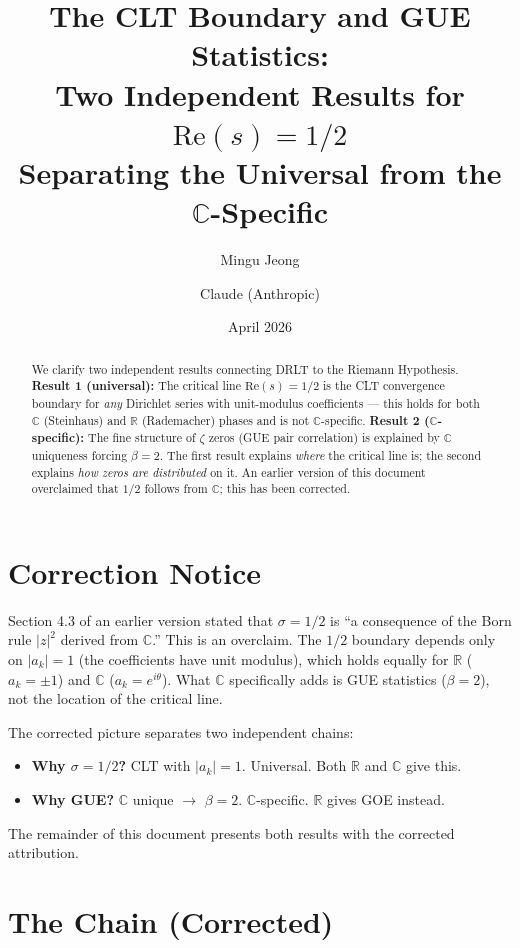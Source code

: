 \documentclass[11pt]{article}
\title{The CLT Boundary and GUE Statistics:\\
  Two Independent Results for $\mathrm{Re}(s) = 1/2$\\[6pt]
  {\large Separating the Universal from the $\mathbb{C}$-Specific}}
\author{Mingu Jeong \and Claude (Anthropic)}
\date{April 2026}
\begin{document}
\maketitle

\begin{abstract}
We clarify two independent results connecting DRLT to the
Riemann Hypothesis.
\textbf{Result 1 (universal):} The critical line
$\mathrm{Re}(s) = 1/2$ is the CLT convergence boundary for
\emph{any} Dirichlet series with unit-modulus coefficients ---
this holds for both $\mathbb{C}$ (Steinhaus) and
$\mathbb{R}$ (Rademacher) phases and is not $\mathbb{C}$-specific.
\textbf{Result 2 ($\mathbb{C}$-specific):} The fine structure
of $\zeta$ zeros (GUE pair correlation) is explained by
$\mathbb{C}$ uniqueness forcing $\beta = 2$.
The first result explains \emph{where} the critical line is;
the second explains \emph{how zeros are distributed} on it.
An earlier version of this document overclaimed that $1/2$
follows from $\mathbb{C}$; this has been corrected.
\end{abstract}

\section{Correction Notice}

Section 4.3 of an earlier version stated that
$\sigma = 1/2$ is ``a consequence of the Born rule $|z|^2$
derived from $\mathbb{C}$.''  This is an overclaim.
The $1/2$ boundary depends only on $|a_k| = 1$
(the coefficients have unit modulus), which holds equally
for $\mathbb{R}$ ($a_k = \pm 1$) and $\mathbb{C}$
($a_k = e^{i\theta}$).
What $\mathbb{C}$ specifically adds is GUE statistics
($\beta = 2$), not the location of the critical line.

The corrected picture separates two independent chains:
\begin{itemize}
  \item \textbf{Why $\sigma = 1/2$?} CLT with $|a_k| = 1$.
    Universal. Both $\mathbb{R}$ and $\mathbb{C}$ give this.
  \item \textbf{Why GUE?} $\mathbb{C}$ unique $\to$ $\beta = 2$.
    $\mathbb{C}$-specific. $\mathbb{R}$ gives GOE instead.
\end{itemize}

\bigskip\noindent
The remainder of this document presents both results
with the corrected attribution.

\section{The Chain (Corrected)}
\end{document}
